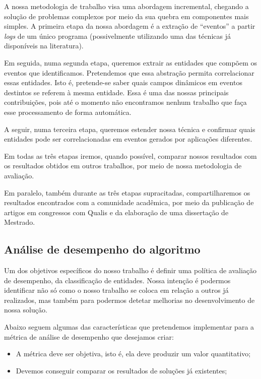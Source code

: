 \documentclass[
	12pt,				%
	openright,			%
	twoside,			%
	a4paper,			%
	english,			%
	spanish,			%
	brazil,				%
	]{abntex2}
\begin{document}
A nossa metodologia de trabalho visa uma abordagem incremental, chegando a solução de problemas complexos por meio da sua quebra em componentes mais simples. A primeira etapa da nossa abordagem é a extração de ``eventos'' a partir \emph{logs} de um único programa (possivelmente utilizando uma das técnicas já disponíveis na literatura).

Em seguida, numa segunda etapa, queremos extrair as entidades que compõem os eventos que identificamos. Pretendemos que essa abstração permita correlacionar essas entidades. Isto é, pretende-se saber quais campos dinâmicos em eventos destintos se referem à mesma entidade. Essa é uma das nossas principais contribuições, pois até o momento não encontramos nenhum trabalho que faça esse processamento de forma automática.

A seguir, numa terceira etapa, queremos estender nossa técnica e confirmar quais entidades pode ser correlacionadas em eventos gerados por aplicações diferentes.

Em todas as três etapas iremos, quando possível, comparar nossos resultados com os resultados obtidos em outros trabalhos, por meio de nossa metodologia de avaliação.

Em paralelo, também durante as três etapas supracitadas, compartilharemos os resultados encontrados com a comunidade acadêmica, por meio da publicação de artigos em congressos com Qualis e da elaboração de uma dissertação de Mestrado.

\subsection{Análise de desempenho do algoritmo}

Um dos objetivos específicos do nosso trabalho é definir uma política de avaliação de desempenho, da classificação de entidades. Nossa intenção é podermos identificar não só como o nosso trabalho se coloca em relação a outros já realizados, mas também para podermos detetar melhorias no desenvolvimento de nossa solução.

Abaixo seguem algumas das características que pretendemos implementar para a métrica de análise de desempenho que desejamos criar:

\begin{itemize}
	\item A métrica deve ser objetiva, isto é, ela deve produzir um valor quantitativo;
	\item Devemos conseguir comparar os resultados de soluções já existentes;
\end{itemize}
\end{document}

